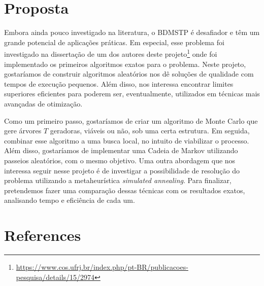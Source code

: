 \documentclass[12pt]{article}
\begin{document}
\section{Proposta}

Embora ainda pouco investigado na literatura, o BDMSTP é desafiador e têm um grande potencial de aplicações práticas. Em especial, esse problema foi investigado na dissertação de um dos autores deste projeto\footnote{\url{https://www.cos.ufrj.br/index.php/pt-BR/publicacoes-pesquisa/details/15/2974}} onde foi implementado os primeiros algoritmos exatos para o problema. Neste projeto, gostaríamos de construir algoritmos aleatórios nos dê soluções de qualidade com tempos de execução pequenos. Além disso, nos interessa encontrar limites superiores eficientes para poderem ser, eventualmente, utilizados em técnicas mais avançadas de otimização. 

Como um primeiro passo, gostaríamos de criar um algoritmo de Monte Carlo que gere árvores $T$ geradoras, viáveis ou não, sob uma certa estrutura. Em seguida, combinar esse algoritmo a uma busca local, no intuito de viabilizar o processo. Além disso, gostaríamos de implementar uma Cadeia de Markov utilizando passeios aleatórios, com o mesmo objetivo. Uma outra abordagem que nos interessa seguir nesse projeto é de investigar a possibilidade de resolução do problema utilizando a metaheurística \textit{simulated annealing}. Para finalizar, pretendemos fazer uma comparação dessas técnicas com os resultados exatos, analisando tempo e eficiência de cada um. 






\section{References}





\end{document}
